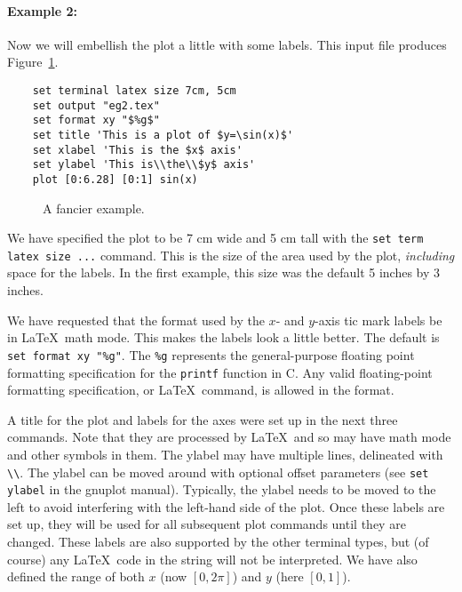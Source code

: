\paragraph{Example 2:} Now we will embellish the plot a little with
some labels.  This input file produces Figure~\ref{eg2}.

\singlespace
\begin{verbatim}
    set terminal latex size 7cm, 5cm
    set output "eg2.tex"
    set format xy "$%g$"
    set title 'This is a plot of $y=\sin(x)$'
    set xlabel 'This is the $x$ axis'
    set ylabel 'This is\\the\\$y$ axis'
    plot [0:6.28] [0:1] sin(x)
\end{verbatim}
\currentspace

\begin{figure}[htbp]
  \begin{center}
    
  \end{center}
  \caption{A fancier example.}
  \label{eg2}
\end{figure}

We have specified the plot to be 7 cm wide and 5 cm tall with
the {\tt set term latex size ...} command. This is the size of the 
area used by the plot, {\em including} space for the labels.
In the first example, this size was the default 5 inches by 3 inches.

We have requested that the format used by the $x$- and $y$-axis tic
mark labels be in \LaTeX\ math mode. This makes the labels look a
little better. The default is \verb+set format xy "%g"+. The \verb+%g+
represents the general-purpose floating point formatting specification
for the {\tt printf} function in C. Any valid floating-point
formatting specification, or \LaTeX\ command, is allowed in the
format.

A title for the plot and labels for the axes were set up in the next
three commands.  Note that they are processed by \LaTeX\ and so may
have math mode and other symbols in them. The ylabel may have multiple
lines, delineated with \verb+\\+.  The ylabel can be moved around with
optional offset parameters (see {\tt set ylabel} in the gnuplot
manual). Typically, the ylabel needs to be moved to the left to avoid
interfering with the left-hand side of the plot.  Once these labels
are set up, they will be used for all subsequent plot commands until
they are changed. These labels are also supported by the other
terminal types, but (of course) any \LaTeX\ code in the string will
not be interpreted. We have also defined the range of both $x$ (now
$[0,2\pi]$) and $y$ (here $[0,1]$).

